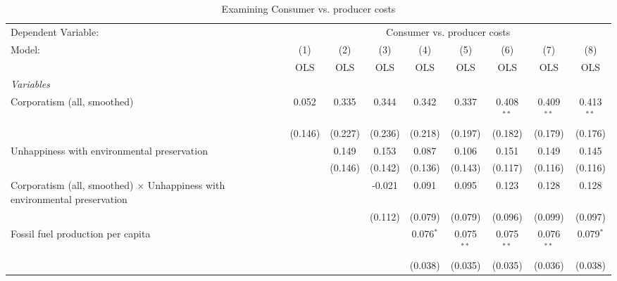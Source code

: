 
\begin{table}[htbp]
   \caption{Examining Consumer vs. producer costs}
   \centering
   \begin{tabular}{lcccccccc}
      \toprule
      Dependent Variable: & \multicolumn{8}{c}{Consumer vs. producer costs}\\
      Model:                                                                            & (1)     & (2)     & (3)     & (4)         & (5)          & (6)          & (7)          & (8)\\  
                                                                                        &  OLS    & OLS     & OLS     & OLS         & OLS          & OLS          & OLS          & OLS\\  
      \midrule
      \emph{Variables}\\
      Corporatism (all, smoothed)                                                       & 0.052   & 0.335   & 0.344   & 0.342       & 0.337        & 0.408$^{**}$ & 0.409$^{**}$ & 0.413$^{**}$\\   
                                                                                        & (0.146) & (0.227) & (0.236) & (0.218)     & (0.197)      & (0.182)      & (0.179)      & (0.176)\\   
      Unhappiness with environmental preservation                                       &         & 0.149   & 0.153   & 0.087       & 0.106        & 0.151        & 0.149        & 0.145\\   
                                                                                        &         & (0.146) & (0.142) & (0.136)     & (0.143)      & (0.117)      & (0.116)      & (0.116)\\   
      Corporatism (all, smoothed) $\times$ Unhappiness with environmental preservation  &         &         & -0.021  & 0.091       & 0.095        & 0.123        & 0.128        & 0.128\\   
                                                                                        &         &         & (0.112) & (0.079)     & (0.079)      & (0.096)      & (0.099)      & (0.097)\\   
      Fossil fuel production per capita                                                 &         &         &         & 0.076$^{*}$ & 0.075$^{**}$ & 0.075$^{**}$ & 0.076$^{**}$ & 0.079$^{*}$\\   
                                                                                        &         &         &         & (0.038)     & (0.035)      & (0.035)      & (0.036)      & (0.038)\\   

\end{tabular}
\end{table}

